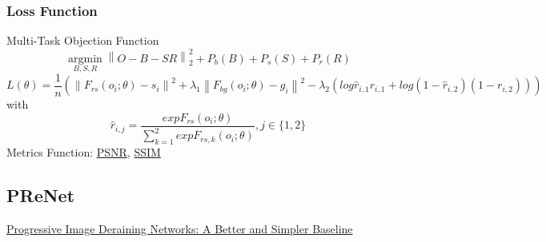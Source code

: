 \documentclass{article}
\newcommand\norm[1]{\left\lVert#1\right\rVert}
\begin{document}
\subsubsection{Loss Function}
Multi-Task Objection Function
\begin{equation}
\operatorname*{argmin}_{B,S,R}\norm{O-B-SR}_2^2+P_b(B)+P_s(S)+P_r(R)
\end{equation}
\begin{equation}
L(\theta)=\frac{1}{n}(\norm{F_{rs}(o_i;\theta)-s_i}^2+\lambda_1\norm{F_{bg}(o_i;\theta)-g_i}^2-\lambda_2(log\hat{r}_{i,1}r_{i,1}+log(1-\hat{r}_{i,2})(1-r_{i,2})))
\end{equation}
with 
\begin{equation}
\hat{r}_{i,j}=\frac{exp{F_{rs}(o_i;\theta)}}{\sum_{k=1}^{2}exp{F_{rs,k}(o_i;\theta)}},j\in{\{1,2\}}
\end{equation}
Metrics Function: \href{https://en.wikipedia.org/wiki/Peak_signal-to-noise_ratio}{PSNR}, \href{https://en.wikipedia.org/wiki/Structural_similarity}{SSIM}

\subsection{PReNet}
\href{https://csdwren.github.io/papers/PReNet_cvpr_camera.pdf}{Progressive Image Deraining Networks: A Better and Simpler Baseline}
\end{document}
